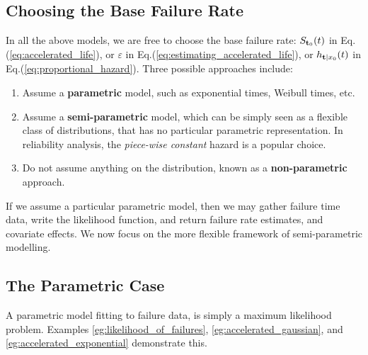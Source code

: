 \documentclass[12pt,a4paper]{report}
\theoremstyle{plain}
\theoremstyle{definition}
\begin{document}
\subsection{Choosing the Base Failure Rate}
In all the above models, we are free to choose the base failure rate: 
$S_{\mathbf{t}_0} (t)$ in Eq.(\ref{eq:accelerated_life}), or
$\varepsilon$ in Eq.(\ref{eq:estimating_accelerated_life}), or 
$h_{\mathbf{t}|x_0} (t)$ in Eq.(\ref{eq:proportional_hazard}).
Three possible approaches include:
\begin{enumerate}
\item Assume a \textbf{parametric} model, such as exponential times, Weibull times, etc.
\item Assume a \textbf{semi-parametric} model, which can be simply seen as a flexible class of distributions, that has no particular parametric representation. In reliability analysis, the \emph{piece-wise constant} hazard is a popular choice.
\item Do not assume anything on the distribution, known as a \textbf{non-parametric} approach. 
\end{enumerate}
If we assume a particular parametric model, then we may gather failure time data, write the likelihood function, and return failure rate estimates, and covariate effects.
We now focus on the more flexible framework of semi-parametric modelling.


\subsection{The Parametric Case}
A parametric model fitting to failure data, is simply a maximum likelihood problem.
Examples \ref{eg:likelihood_of_failures}, \ref{eg:accelerated_gaussian}, and \ref{eg:accelerated_exponential} demonstrate this. 
\end{document}
